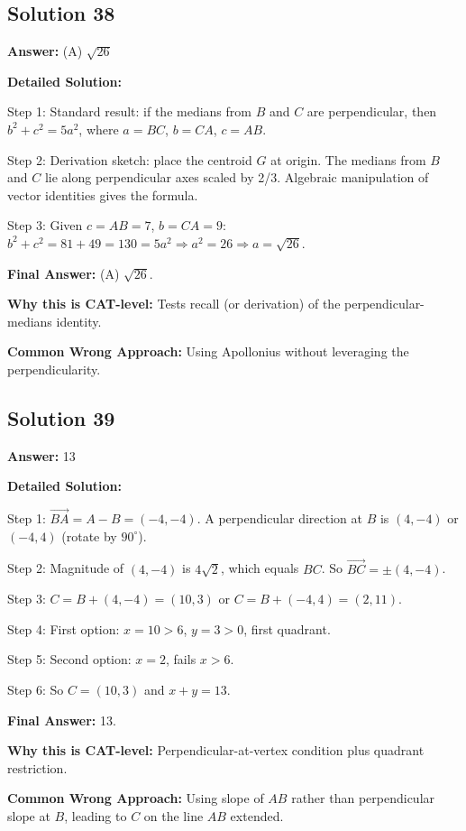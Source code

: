 \documentclass[11pt]{article}
\begin{document}
\subsection*{Solution 38}
\textbf{Answer:} (A) $\sqrt{26}$

\textbf{Detailed Solution:}

Step 1: Standard result: if the medians from $B$ and $C$ are perpendicular, then $b^2 + c^2 = 5 a^2$, where $a = BC$, $b = CA$, $c = AB$.

Step 2: Derivation sketch: place the centroid $G$ at origin. The medians from $B$ and $C$ lie along perpendicular axes scaled by 2/3. Algebraic manipulation of vector identities gives the formula.

Step 3: Given $c = AB = 7$, $b = CA = 9$: $b^2 + c^2 = 81 + 49 = 130 = 5 a^2 \Rightarrow a^2 = 26 \Rightarrow a = \sqrt{26}$.

\textbf{Final Answer:} (A) $\sqrt{26}$.

\textbf{Why this is CAT-level:} Tests recall (or derivation) of the perpendicular-medians identity.

\textbf{Common Wrong Approach:} Using Apollonius without leveraging the perpendicularity.

\subsection*{Solution 39}
\textbf{Answer:} 13

\textbf{Detailed Solution:}

Step 1: $\vec{BA} = A - B = (-4, -4)$. A perpendicular direction at $B$ is $(4, -4)$ or $(-4, 4)$ (rotate by $90^\circ$).

Step 2: Magnitude of $(4, -4)$ is $4\sqrt{2}$, which equals $BC$. So $\vec{BC} = \pm(4, -4)$.

Step 3: $C = B + (4, -4) = (10, 3)$ or $C = B + (-4, 4) = (2, 11)$.

Step 4: First option: $x = 10 > 6$, $y = 3 > 0$, first quadrant. \checkmark

Step 5: Second option: $x = 2$, fails $x > 6$.

Step 6: So $C = (10, 3)$ and $x + y = 13$.

\textbf{Final Answer:} 13.

\textbf{Why this is CAT-level:} Perpendicular-at-vertex condition plus quadrant restriction.

\textbf{Common Wrong Approach:} Using slope of $AB$ rather than perpendicular slope at $B$, leading to $C$ on the line $AB$ extended.
\end{document}
